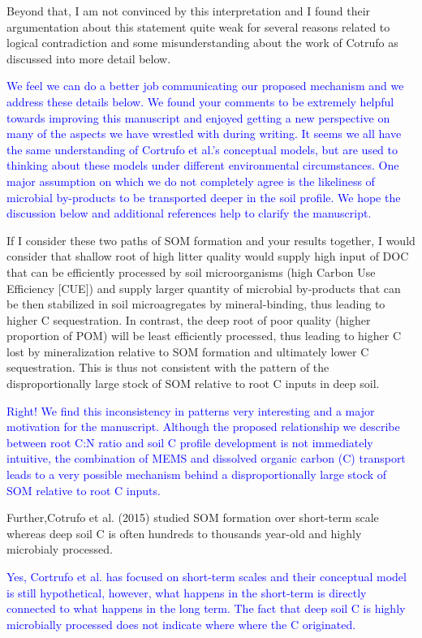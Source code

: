 \documentclass[]{article}
\begin{document}
Beyond that, I am not convinced by this interpretation and I found their
argumentation about this statement quite weak for several reasons
related to logical contradiction and some misunderstanding about the
work of Cotrufo as discussed into more detail below.

\textcolor{blue}{We feel we can do a better job communicating our proposed mechanism and we address these details below. We found your comments to be extremely helpful towards improving this manuscript and enjoyed getting a new perspective on many of the aspects we have wrestled with during writing. It seems we all have the same understanding of Cortrufo et al.'s conceptual models, but are used to thinking about these models under different environmental circumstances. One major assumption on which we do not completely agree is the likeliness of microbial by-products to be transported deeper in the soil profile. We hope the discussion below and additional references help to clarify the manuscript.}

If I consider these two paths of SOM formation and your results
together, I would consider that shallow root of high litter quality
would supply high input of DOC that can be efficiently processed by soil
microorganisms (high Carbon Use Efficiency {[}CUE{]}) and supply larger
quantity of microbial by-products that can be then stabilized in soil
microagregates by mineral-binding, thus leading to higher C
sequestration. In contrast, the deep root of poor quality (higher
proportion of POM) will be least efficiently processed, thus leading to
higher C lost by mineralization relative to SOM formation and ultimately
lower C sequestration. This is thus not consistent with the pattern of
the disproportionally large stock of SOM relative to root C inputs in
deep soil.

\textcolor{blue}{Right! We find this inconsistency in patterns very interesting and a major motivation for the manuscript. Although the proposed relationship we describe between root C:N ratio and soil C profile development is not immediately intuitive, the combination of MEMS and dissolved organic carbon (C) transport leads to a very possible mechanism behind a disproportionally large stock of SOM relative to root C inputs.}

Further,Cotrufo et al. (2015) studied SOM formation over short-term
scale whereas deep soil C is often hundreds to thousands year-old and
highly microbialy processed.

\textcolor{blue}{Yes, Cortrufo et al. has focused on short-term scales and their conceptual model is still hypothetical, however, what happens in the short-term is directly connected to what happens in the long term. The fact that deep soil C is highly microbially processed does not indicate where where the C originated.}
\end{document}
